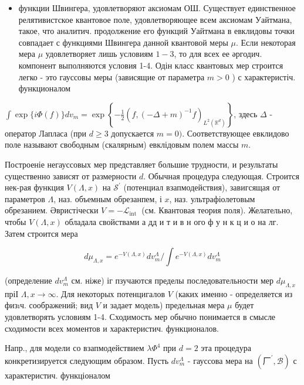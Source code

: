\documentclass[10pt]{article}
\begin{document}
\begin{itemize}

  \item функции Швингера, удовлетворяют аксиомам ОШ. Существует единственное релятивистское квантовое поле, удовлетворяющее всем аксиомам Уайтмана, такое, что аналитич. продолжение его функций Уайтмана в евклидовы точки совпадает с функциями Швингера данной квантовой меры $\mu$. Если некоторая мера $\mu$ удовлетворяет лишь условиям $1-3$, то для всех ее әргодич. компонент выполняются условия 1-4. Одін класс квантовых мер строится легко - это гауссовы меры (зависящие от параметра $m>0$ ) с характеристіч. функционалом

\end{itemize}



$\int \exp \{i \Phi(f)\} d v_{m}=\exp \left\{-\frac{1}{2}\left(f,(-\Delta+m)^{-1} f\right)_{L^{2}\left(\mathbb{R}^{d}\right)}\right\}$, здесь $\Delta$ - оператор Лапласа (при $d \geqslant 3$ допускается $m=0)$. Соответствующее евклидово поле называют свободным (скалярным) евклідовым полем массы $m$.



Построеніе негауссовых мер представляет большие трудности, и результаты существенно зависят от размерности $d$. Обычная процедура следующая. Строится нек-рая функция $V(\Lambda, x)$ на $\mathscr{S}^{\prime}$ (потенциал взапмодействия), завигсящая от параметров $\Lambda$, наз. объемным обрезанпем, і $x$, наз. ультрафіолетовым обрезанием. Әвристічески $V=-\mathscr{L}_{\text {int }}$ (см. Квантовая теория поля). Желательно, чтобы $V(\Lambda, x)$ обладала свойствами а дд и т и в н ого ф у н к ц и о на лг. Затем строится мера



\[

d \mu_{\Lambda, x}=e^{-V(\Lambda, x)} d v_{m}^{\Lambda} / \int e^{-V(\Lambda, x)} d v_{m}^{\Lambda}

\]



(определение $d v_{m}^{\Lambda}$ см. ніже) іг пзучаются пределы последовательности мер $d \mu_{\Lambda, x}$ пріІ $\Lambda, x \rightarrow \infty$. Для некоторых потенцигалов $V$ (каких именно - определяется из физıч. соображений; вид $V$ и задает модель) предельная мера $\mu$ будет удовлетворять условиям 1-4. Сходимость мер обычно понимается в смысле сходимости всех моментов и характеристич. функционалов.



Напр., для модели со взапмодействием $\lambda \Phi^{4}$ при $d=2$ эта процедура конкретизируется следующим образом. Пусть $d v_{m}^{\Lambda}$ - гауссова мера на $\left(\mathscr{厂}^{\prime}, \mathscr{B}\right)$ с характеристич. функціоналом
\end{document}

